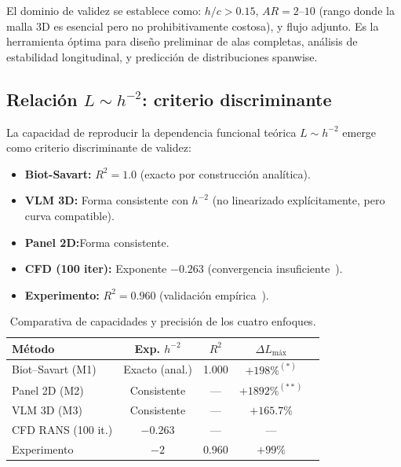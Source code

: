 \documentclass[twocolumn]{article}
\begin{document}
El dominio de validez se establece como: $h/c > 0.15$, $AR = 2$--$10$ (rango donde la malla 3D es esencial pero no prohibitivamente costosa), y flujo adjunto. Es la herramienta óptima para diseño preliminar de alas completas, análisis de estabilidad longitudinal, y predicción de distribuciones spanwise.

\subsection{Relación $L \sim h^{-2}$: criterio discriminante}

La capacidad de reproducir la dependencia funcional teórica $L \sim h^{-2}$ emerge como criterio discriminante de validez:

\begin{itemize}
    \item \textbf{Biot-Savart:} $R^2 = 1.0$ (exacto por construcción analítica).
    \item \textbf{VLM 3D:} Forma consistente con $h^{-2}$ (no linearizado explícitamente, pero curva compatible).
    \item \textbf{Panel 2D:}Forma consistente.
    \item \textbf{CFD (100 iter):} Exponente $-0.263$ (convergencia insuficiente~\cite{autodesk2024}).
    \item \textbf{Experimento:} $R^2 = 0.960$ (validación empírica~\cite{hernandez2012}).
\end{itemize}


\begin{table}[H]
  \centering
  \caption{Comparativa de capacidades y precisión de los cuatro enfoques.}
  \label{tab:comparacion}
  \renewcommand{\arraystretch}{1.5}
  \begin{tabular}{@{}lcccc@{}}
    \toprule
    \textbf{Método} & \textbf{Exp. $h^{-2}$} & $R^2$ & $\Delta L_\text{máx}$\\
    \midrule
    Biot--Savart (M1)   & Exacto (anal.) & 1.000 & $+198\%^{(*)}$ \\
    Panel 2D (M2)       & Consistente    & ---   & $+1892\%^{(**)}$\\
    VLM 3D (M3)         & Consistente    & ---   & $+165.7\%$      \\
    CFD RANS (100 it.)  & $-0.263$       & ---   & ---             \\
    Experimento         & $-2$           & 0.960 & $+99\%$    \\
    \bottomrule
  \end{tabular}
\end{table}
\end{document}
